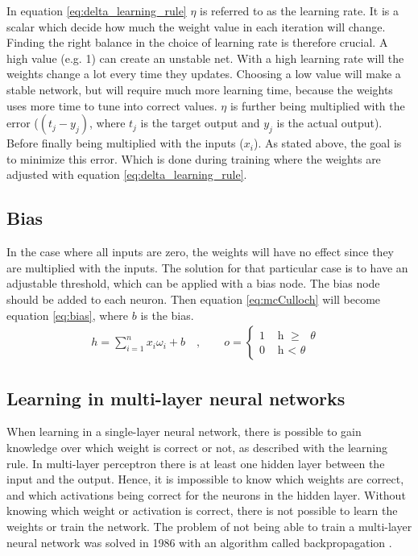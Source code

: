 \documentclass[USenglish]{ifimaster}  %
\begin{document}
In equation \ref{eq:delta_learning_rule} $\eta$ is referred to as the learning rate. It is a scalar which decide how much the weight value in each iteration will change. Finding the right balance in the choice of learning rate is therefore crucial. A high value (e.g. 1) can create an unstable net. With a high learning rate will the weights change a lot every time they updates. %
Choosing a low value will make a stable network, but will require much more learning time, because the weights uses more time to tune into correct values.
\newline
\newline
$\eta$ is further being multiplied with the error ($(t_j - y_j)$, where $t_j$ is the target output and $y_j$ is the actual output). Before finally being multiplied with the inputs ($x_i$). As stated above, the goal is to minimize this error. Which is done during training where the weights are adjusted with equation \ref{eq:delta_learning_rule}.
\subsection{Bias}
In the case where all inputs are zero, the weights will have no effect since they are multiplied with the inputs. The solution for that particular case is to have an adjustable threshold, which can be applied with a bias node. The bias node should be added to each neuron. Then equation \ref{eq:mcCulloch} will become equation \ref{eq:bias}, where $b$ is the bias.
\begin{equation}\label{eq:bias}
\begin{aligned}
    {h = \sum_{i=1}^{n} x_i \omega_i + b \quad , \quad\quad o = 
\begin{cases}
    1 & \text{ h $\geq$ $\theta$ }  \\
    0 & \text{ h < $\theta$ }
\end{cases}}
\end{aligned}
\end{equation}
\subsection{Learning in multi-layer neural networks}
When learning in a single-layer neural network, there is possible to gain knowledge over which weight is correct or not, as described with the learning rule. In multi-layer perceptron there is at least one hidden layer between the input and the output. Hence, it is impossible to know which weights are correct, and which activations being correct for the neurons in the hidden layer. Without knowing which weight or activation is correct, there is not possible to learn the weights or train the network. The problem of not being able to train a multi-layer neural network was solved in 1986 with an algorithm called backpropagation \cite{Rumelhart:1986:LIR:104279.104293}.
\end{document}
